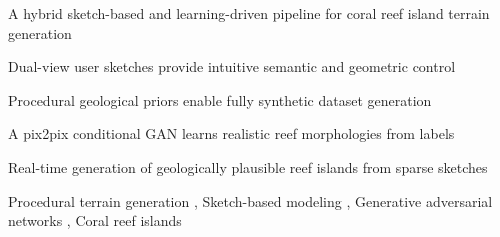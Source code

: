 \documentclass[final,5p,times,twocolumn]{elsarticle}
\begin{document}
\begin{frontmatter}

\begin{highlights}
\item A hybrid sketch-based and learning-driven pipeline for coral reef island terrain generation
\item Dual-view user sketches provide intuitive semantic and geometric control
\item Procedural geological priors enable fully synthetic dataset generation
\item A pix2pix conditional GAN learns realistic reef morphologies from labels
\item Real-time generation of geologically plausible reef islands from sparse sketches
\end{highlights}

\begin{keyword}
Procedural terrain generation \sep
Sketch-based modeling \sep
Generative adversarial networks \sep
Coral reef islands


\end{keyword}

\end{frontmatter}


%  
%  
 



\end{document}
